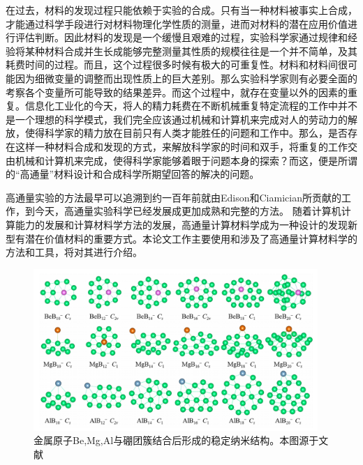 在过去，材料的发现过程只能依赖于实验的合成。只有当一种材料被事实上合成，才能通过科学手段进行对材料物理化学性质的测量，进而对材料的潜在应用价值进行评估判断。因此材料的发现是一个缓慢且艰难的过程，实验科学家通过规律和经验将某种材料合成并生长成能够完整测量其性质的规模往往是一个并不简单，及其耗费时间的过程。而且，这个过程很多时候有极大的可重复性。材料和材料间很可能因为细微变量的调整而出现性质上的巨大差别。那么实验科学家则有必要全面的考察各个变量所可能导致的结果差异。而这个过程中，就存在变量以外的因素的重复。信息化工业化的今天，将人的精力耗费在不断机械重复特定流程的工作中并不是一个理想的科学模式，我们完全应该通过机械和计算机来完成对人的劳动力的解放，使得科学家的精力放在目前只有人类才能胜任的问题和工作中。那么，是否存在这样一种材料合成和发现的方式，来解放科学家的时间和双手，将重复的工作交由机械和计算机来完成，使得科学家能够着眼于问题本身的探索？而这，便是所谓的“高通量”材料设计和合成科学所期望回答的解决的问题。

高通量实验的方法最早可以追溯到约一百年前就由Edison和Ciamician\cite{ciamician1912photochemistry}所贡献的工作，到今天，高通量实验科学已经发展成更加成熟和完整的方法\cite{curtarolo2003predicting,ceder1998identification,johannesson2002combined,curtarolo2005accuracy,xiang1995combinatorial,koinuma2004combinatorial,takeuchi2003identification}。
随着计算机计算能力的发展和计算材料学方法的发展，高通量计算材料学成为一种设计的发现新型有潜在价值材料的重要方式。本论文工作主要使用和涉及了高通量计算材料学的方法和工具，将对其进行介绍。

\begin{figure}
  \includegraphics[width=0.96\textwidth]{figs/ch1_boron_cluster01.png}
  \centering
  \caption{金属原子Be,Mg,Al与硼团簇结合后形成的稳定纳米结构。本图源于文献\cite{tian2019cluster}}
  \label{fig:ch1_boron_cluster01}
\end{figure}

